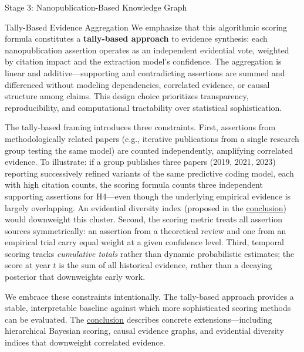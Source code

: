 \documentclass[
  ignorenonframetext,
]{beamer}
\begin{document}
\begin{frame}[fragile]{Stage 3: Nanopublication-Based Knowledge Graph
\label{sec:methods_kg}}
\begin{block}{Tally-Based Evidence Aggregation}
\protect{}\label{tally-based-evidence-aggregation}
We emphasize that this algorithmic scoring formula constitutes a
\textbf{tally-based approach} to evidence synthesis: each
nanopublication assertion operates as an independent evidential vote,
weighted by citation impact and the extraction model's confidence. The
aggregation is linear and additive---supporting and contradicting
assertions are summed and differenced without modeling dependencies,
correlated evidence, or causal structure among claims. This design
choice prioritizes transparency, reproducibility, and computational
tractability over statistical sophistication.

The tally-based framing introduces three constraints. First, assertions
from methodologically related papers (e.g., iterative publications from
a single research group testing the same model) are counted
independently, amplifying correlated evidence. To illustrate: if a group
publishes three papers (2019, 2021, 2023) reporting successively refined
variants of the same predictive coding model, each with high citation
counts, the scoring formula counts three independent supporting
assertions for H4---even though the underlying empirical evidence is
largely overlapping. An evidential diversity index (proposed in the
\hyperref[sec:conclusion]{conclusion}) would downweight this cluster.
Second, the scoring metric treats all assertion sources symmetrically:
an assertion from a theoretical review and one from an empirical trial
carry equal weight at a given confidence level. Third, temporal scoring
tracks \emph{cumulative totals} rather than dynamic probabilistic
estimates; the score at year \(t\) is the sum of all historical
evidence, rather than a decaying posterior that downweights early work.

We embrace these constraints intentionally. The tally-based approach
provides a stable, interpretable baseline against which more
sophisticated scoring methods can be evaluated. The
\hyperref[sec:conclusion]{conclusion} describes concrete
extensions---including hierarchical Bayesian scoring, causal evidence
graphs, and evidential diversity indices that downweight correlated
evidence.
\end{block}
\end{frame}
\end{document}
